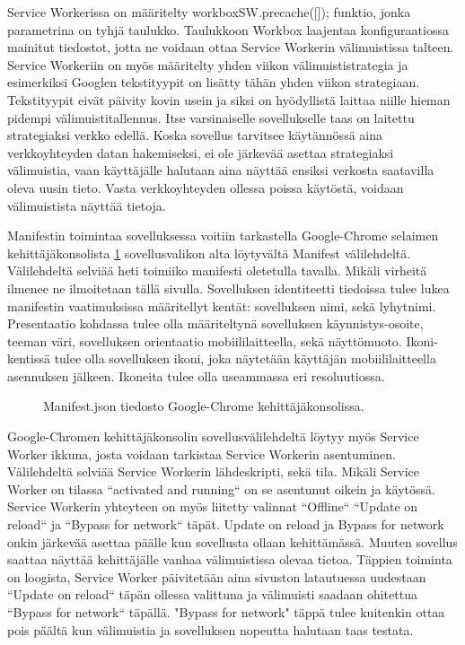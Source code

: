 \documentclass{tktltiki}
\begin{document}
Service Workerissa on määritelty workboxSW.precache([]); funktio, jonka parametrina on tyhjä taulukko. Taulukkoon Workbox laajentaa konfiguraatiossa mainitut tiedostot, jotta ne voidaan ottaa Service Workerin välimuistissa talteen. Service Workeriin on myös määritelty yhden viikon välimuististrategia ja esimerkiksi Googlen tekstityypit on lisätty tähän yhden viikon strategiaan. Tekstityypit eivät päivity kovin usein ja siksi on hyödyllistä laittaa niille hieman pidempi välimuistitallennus. Itse varsinaiselle sovellukselle taas on laitettu strategiaksi verkko edellä. Koska sovellus tarvitsee käytännössä aina verkkoyhteyden datan hakemiseksi, ei ole järkevää asettaa strategiaksi välimuistia, vaan käyttäjälle halutaan aina näyttää ensiksi verkosta saatavilla oleva uusin tieto. Vasta verkkoyhteyden ollessa poissa käytöstä, voidaan välimuistista näyttää tietoja. 

Manifestin toimintaa sovelluksessa voitiin tarkastella Google-Chrome selaimen kehittäjäkonsolista \ref{Manifest.json} sovellusvalikon alta löytyvältä Manifest välilehdeltä. Välilehdeltä selviää heti toimiiko manifesti oletetulla tavalla. Mikäli virheitä ilmenee ne ilmoitetaan tällä sivulla. Sovelluksen identiteetti tiedoissa tulee lukea manifestin vaatimuksissa määritellyt kentät: sovelluksen nimi, sekä lyhytnimi. Presentaatio kohdassa tulee olla määriteltynä sovelluksen käynnistys-osoite, teeman väri, sovelluksen orientaatio mobiililaitteella, sekä näyttömuoto. Ikoni-kentissä tulee olla sovelluksen ikoni, joka näytetään käyttäjän mobiililaitteella asennuksen jälkeen. Ikoneita tulee olla useammassa eri resoluutiossa. 

\begin{figure}[h]
\begin{center}
\caption{Manifest.json tiedosto Google-Chrome kehittäjäkonsolissa.}
\label{Manifest.json}
\end{center}
\end{figure}
\clearpage

Google-Chromen kehittäjäkonsolin sovellusvälilehdeltä löytyy myös Service Worker ikkuna, josta voidaan tarkistaa Service Workerin asentuminen. Välilehdeltä selviää Service Workerin lähdeskripti, sekä tila. Mikäli Service Worker on tilassa “activated and running“ on se asentunut oikein ja käytössä. Service Workerin yhteyteen on myös liitetty valinnat “Offline“ “Update on reload“ ja “Bypass for network“ täpät. Update on reload ja Bypass for network onkin järkevää asettaa päälle kun sovellusta ollaan kehittämässä. Muuten sovellus saattaa näyttää kehittäjälle vanhaa välimuistissa olevaa tietoa. Täppien toiminta on loogista, Service Worker päivitetään aina sivuston latautuessa uudestaan “Update on reload“ täpän ollessa valittuna ja välimuisti saadaan ohitettua “Bypass for network“ täpällä. "Bypass for network" täppä tulee kuitenkin ottaa pois päältä kun välimuistia ja sovelluksen nopeutta halutaan taas testata.
\end{document}
